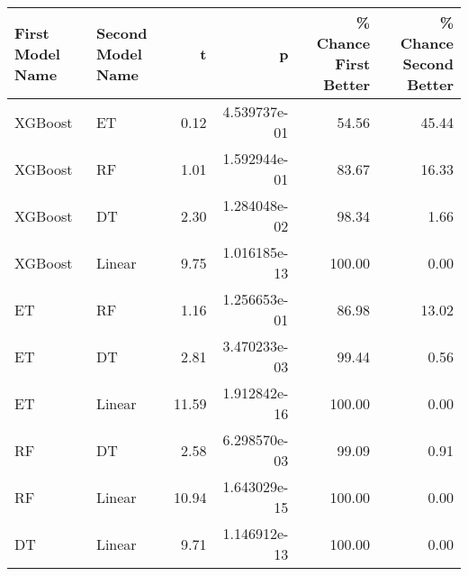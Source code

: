 \begin{tabular}{llrrrr}
\toprule
First Model Name & Second Model Name &     t &            p &  \% Chance First Better &  \% Chance Second Better \\
\midrule
         XGBoost &                ET &  0.12 & 4.539737e-01 &                  54.56 &                   45.44 \\
         XGBoost &                RF &  1.01 & 1.592944e-01 &                  83.67 &                   16.33 \\
         XGBoost &                DT &  2.30 & 1.284048e-02 &                  98.34 &                    1.66 \\
         XGBoost &            Linear &  9.75 & 1.016185e-13 &                 100.00 &                    0.00 \\
              ET &                RF &  1.16 & 1.256653e-01 &                  86.98 &                   13.02 \\
              ET &                DT &  2.81 & 3.470233e-03 &                  99.44 &                    0.56 \\
              ET &            Linear & 11.59 & 1.912842e-16 &                 100.00 &                    0.00 \\
              RF &                DT &  2.58 & 6.298570e-03 &                  99.09 &                    0.91 \\
              RF &            Linear & 10.94 & 1.643029e-15 &                 100.00 &                    0.00 \\
              DT &            Linear &  9.71 & 1.146912e-13 &                 100.00 &                    0.00 \\
\bottomrule
\end{tabular}
